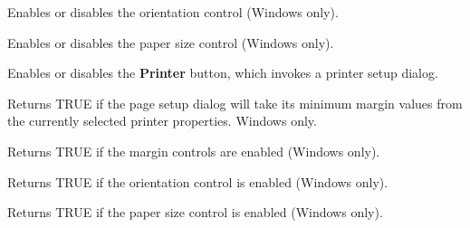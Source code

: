 \label{wxpagesetupdialogdataenableorientation}


Enables or disables the orientation control (Windows only).

\label{wxpagesetupdialogdataenablepaper}


Enables or disables the paper size control (Windows only).

\label{wxpagesetupdialogdataenableprinter}


Enables or disables the {\bf Printer} button, which invokes a printer setup dialog.

\label{wxpagesetupdialogdatagetdefaultminmargins}


Returns TRUE if the page setup dialog will take its minimum margin values from the currently
selected printer properties. Windows only.

\label{wxpagesetupdialogdatagetenablemargins}


Returns TRUE if the margin controls are enabled (Windows only).

\label{wxpagesetupdialogdatagetenableorientation}


Returns TRUE if the orientation control is enabled (Windows only).

\label{wxpagesetupdialogdatagetenablepaper}


Returns TRUE if the paper size control is enabled (Windows only).

\label{wxpagesetupdialogdatagetenableprinter}


